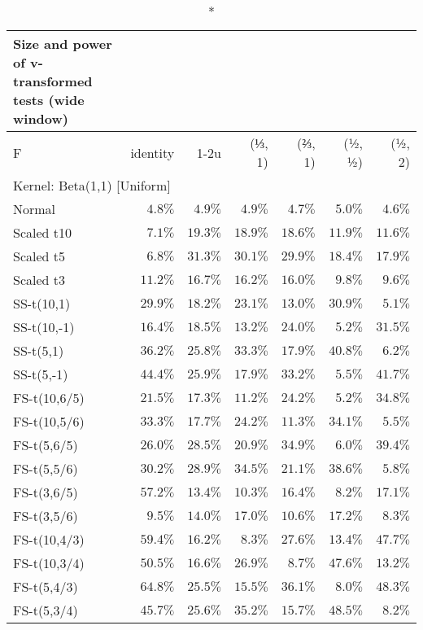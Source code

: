 \setlength{\LTpost}{0mm}
\begin{longtable}{lrrrrrr}
\caption*{
{\large Size and power of v-transformed tests (wide window)}
} \\ 
\toprule
F & identity & \textbar{}1-2u\textbar{} & (⅓, 1) & (⅔, 1) & (½, ½) & (½, 2) \\ 
\midrule
\multicolumn{7}{l}{Kernel: Beta(1,1) [Uniform]} \\ 
\midrule
Normal & $4.8\%$ & $4.9\%$ & $4.9\%$ & $4.7\%$ & $5.0\%$ & $4.6\%$ \\ 
Scaled t10 & $7.1\%$ & $19.3\%$ & $18.9\%$ & $18.6\%$ & $11.9\%$ & $11.6\%$ \\ 
Scaled t5 & $6.8\%$ & $31.3\%$ & $30.1\%$ & $29.9\%$ & $18.4\%$ & $17.9\%$ \\ 
Scaled t3 & $11.2\%$ & $16.7\%$ & $16.2\%$ & $16.0\%$ & $9.8\%$ & $9.6\%$ \\ 
SS-t(10,1) & $29.9\%$ & $18.2\%$ & $23.1\%$ & $13.0\%$ & $30.9\%$ & $5.1\%$ \\ 
SS-t(10,-1) & $16.4\%$ & $18.5\%$ & $13.2\%$ & $24.0\%$ & $5.2\%$ & $31.5\%$ \\ 
SS-t(5,1) & $36.2\%$ & $25.8\%$ & $33.3\%$ & $17.9\%$ & $40.8\%$ & $6.2\%$ \\ 
SS-t(5,-1) & $44.4\%$ & $25.9\%$ & $17.9\%$ & $33.2\%$ & $5.5\%$ & $41.7\%$ \\ 
FS-t(10,6/5) & $21.5\%$ & $17.3\%$ & $11.2\%$ & $24.2\%$ & $5.2\%$ & $34.8\%$ \\ 
FS-t(10,5/6) & $33.3\%$ & $17.7\%$ & $24.2\%$ & $11.3\%$ & $34.1\%$ & $5.5\%$ \\ 
FS-t(5,6/5) & $26.0\%$ & $28.5\%$ & $20.9\%$ & $34.9\%$ & $6.0\%$ & $39.4\%$ \\ 
FS-t(5,5/6) & $30.2\%$ & $28.9\%$ & $34.5\%$ & $21.1\%$ & $38.6\%$ & $5.8\%$ \\ 
FS-t(3,6/5) & $57.2\%$ & $13.4\%$ & $10.3\%$ & $16.4\%$ & $8.2\%$ & $17.1\%$ \\ 
FS-t(3,5/6) & $9.5\%$ & $14.0\%$ & $17.0\%$ & $10.6\%$ & $17.2\%$ & $8.3\%$ \\ 
FS-t(10,4/3) & $59.4\%$ & $16.2\%$ & $8.3\%$ & $27.6\%$ & $13.4\%$ & $47.7\%$ \\ 
FS-t(10,3/4) & $50.5\%$ & $16.6\%$ & $26.9\%$ & $8.7\%$ & $47.6\%$ & $13.2\%$ \\ 
FS-t(5,4/3) & $64.8\%$ & $25.5\%$ & $15.5\%$ & $36.1\%$ & $8.0\%$ & $48.3\%$ \\ 
FS-t(5,3/4) & $45.7\%$ & $25.6\%$ & $35.2\%$ & $15.7\%$ & $48.5\%$ & $8.2\%$ \\ 

\end{longtable}
